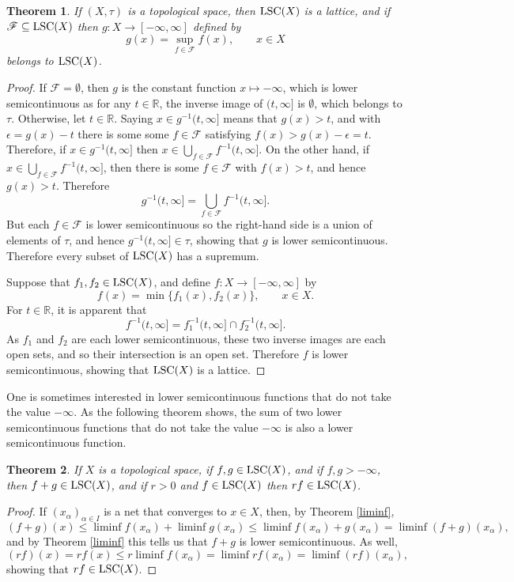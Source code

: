 \documentclass{article}
\newcommand{\LSC}{\ensuremath\mathrm{LSC}}
\newtheorem{theorem}{Theorem}
\theoremstyle{definition}
\begin{document}
\begin{theorem}
If $(X,\tau)$ is a topological space, then $\LSC(X)$ is a  lattice, and if $\mathscr{F} \subseteq \LSC(X)$ then $g:X \to [-\infty,\infty]$ defined by
\[
g(x)=\sup_{f \in \mathscr{F}} f(x), \qquad x \in X
\]
belongs to $\LSC(X)$.
\label{LSClattice}
\end{theorem}
\begin{proof}
If $\mathscr{F}=\emptyset$, then $g$ is the constant function $x \mapsto -\infty$, which is lower
semicontinuous as for any $t \in \mathbb{R}$, the inverse image of $(t,\infty]$ is $\emptyset$, which belongs to $\tau$. 
Otherwise, let
 $t \in \mathbb{R}$. Saying  $x \in g^{-1}(t,\infty]$
 means that $g(x)>t$, and with $\epsilon=g(x)-t$ there is some some $f \in \mathscr{F}$ satisfying $f(x)>g(x)-\epsilon=t$. Therefore, if $x \in g^{-1}(t,\infty]$ then
 $x \in \bigcup_{f \in \mathscr{F}} f^{-1}(t,\infty]$. On the other hand, if $x \in \bigcup_{f \in \mathscr{F}} f^{-1}(t,\infty]$, then there is some $f \in \mathscr{F}$ with $f(x)>t$, and hence
 $g(x)>t$.
 Therefore
 \[
  g^{-1}(t,\infty] = \bigcup_{f \in \mathscr{F}} f^{-1}(t,\infty].
 \]
 But each $f \in \mathscr{F}$ is lower semicontinuous so the right-hand side is a union of elements of $\tau$, and hence
 $g^{-1}(t,\infty] \in \tau$, showing that 
$g$ is lower semicontinuous.
Therefore every subset of $\LSC(X)$ has a supremum.

Suppose that $f_1,f_2 \in \LSC(X)$, and define $f:X \to [-\infty,\infty]$ by 
\[
f(x)=\min\{f_1(x),f_2(x)\}, \qquad x \in X.
\]
For $t \in \mathbb{R}$, it is apparent that
\[
f^{-1}(t,\infty] = f_1^{-1}(t,\infty] \cap f_2^{-1}(t,\infty].
\]
As $f_1$ and $f_2$ are each lower semicontinuous, these two inverse images are each open sets, and so their intersection is an open set. Therefore $f$ is lower semicontinuous,
showing that $\LSC(X)$ is a lattice.
\end{proof}

One is sometimes interested in lower semicontinuous functions that do not take the value $-\infty$. As the following theorem
shows, the sum of two lower semicontinuous functions that do not take the value $-\infty$ is also a lower semicontinuous function.

\begin{theorem}
If $X$ is a topological space, if $f,g \in \LSC(X)$, and if $f,g > -\infty$, then $f+g \in \LSC(X)$, and if $r>0$ and $f \in \LSC(X)$ then $rf \in \LSC(X)$.
\end{theorem}
\begin{proof}
If $(x_\alpha)_{\alpha \in I}$ is a net that converges to $x \in X$, then, by Theorem \ref{liminf},
\[
(f+g)(x) \leq \liminf f(x_\alpha) + \liminf g(x_\alpha) \leq \liminf f(x_\alpha)+g(x_\alpha) = \liminf (f+g)(x_\alpha),
\]
and by Theorem \ref{liminf} this tells us that $f+g$ is lower semicontinuous. As well,
\[
(rf)(x)=rf(x) \leq r \liminf f(x_\alpha) = \liminf rf(x_\alpha) = \liminf (rf)(x_\alpha),
\]
showing that $rf \in \LSC(X)$.
\end{proof}
\end{document}
